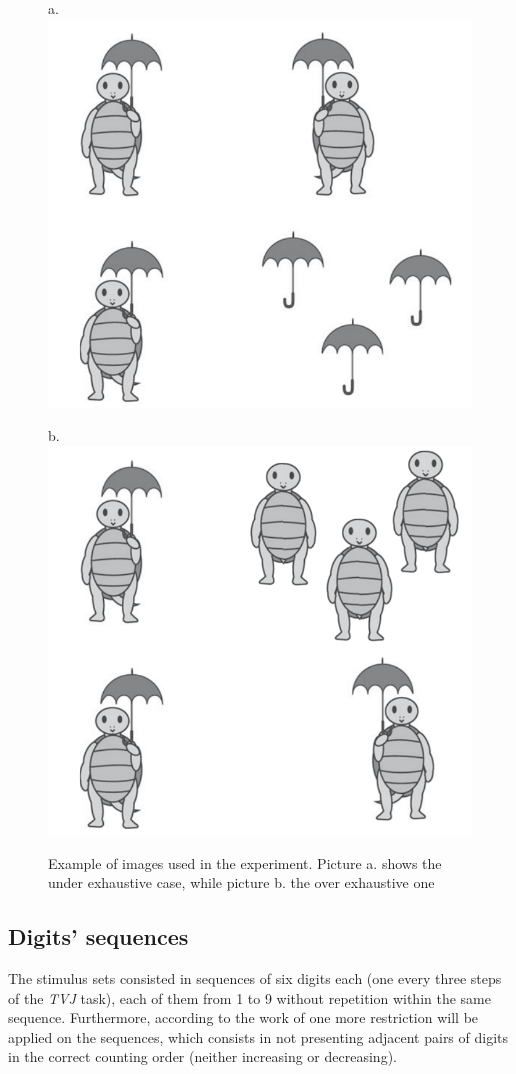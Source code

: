 \documentclass[10pt, a4]{article}
\begin{document}
\begin{figure} [!ht]
    \begin{minipage}{0.48\textwidth}
      a.
      \centering
      \includegraphics[width=.7\linewidth]{proj_prop_turtles_under_exhaustive.png}
      \label{img-target-under-exhaustive}    
    \end{minipage}
    \begin {minipage}{0.48\textwidth}
      b.
      \centering
      \includegraphics[width=.7\linewidth]{proj_prop_turtles_over_exhaustive.png}
      \label{img-target-over-exhaustive}
    \end{minipage}
    \caption{Example of images used in the experiment. Picture a. shows the under exhaustive case, while picture b. the over exhaustive one}
    \label{img-target-sample}
\end{figure}


\subsection{Digits' sequences}
The stimulus sets consisted in sequences of six digits each (one every three steps of the \textit{TVJ} task), each of them from 1 to 9 without
repetition within the same sequence. Furthermore, according to the work of \cite{taub1972comparison} one more restriction will be applied on the sequences,
which consists in not presenting adjacent pairs of digits in the correct counting order (neither increasing or decreasing).
\end{document}
